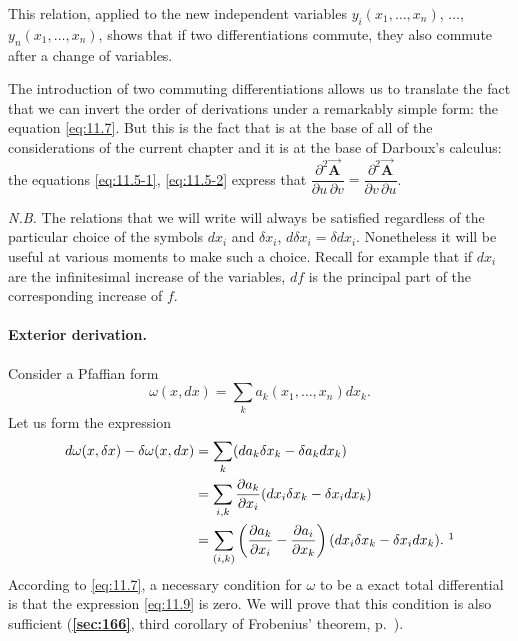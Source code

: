 \documentclass[leqno,11pt]{book}
\numberwithin{equation}{chapter}
\newcommand{\pd}{\partial}
\theoremstyle{shape1}
\theoremstyle{shapesmall}
\newcommand{\fsref}[1]{{\rm\textsection\textbf{\ref{sec:#1}}}}
\newcommand{\somespace}{\vspace{9pt}}
\begin{document}
This relation, applied to the new independent variables $y_{i}(x_{1},\dots,x_{n})$, $\dots$, $y_{n}(x_{1},\dots,x_{n})$, shows that if two differentiations commute, they also commute after a change of variables.

The introduction of two commuting differentiations allows us to translate the fact that we can invert the order of derivations under a remarkably simple form: the equation \eqref{eq:11.7}. But this is the fact that is at the base of all of the considerations of the current chapter and it is at the base of Darboux's calculus: the equations \eqref{eq:11.5-1}, \eqref{eq:11.5-2} express that $\dfrac{\pd^{2}\vec{\mathbf{A}}}{\pd u\,\pd v}=\dfrac{\pd^{2}\vec{\mathbf{A}}}{\pd v\,\pd u}$.

\somespace

\emph{N.B.} The relations that we will write will always be satisfied regardless of the particular choice of the symbols $dx_{i}$ and $\delta x_{i}$, $d\delta x_{i}=\delta dx_{i}$. Nonetheless it will be useful at various moments to make such a choice. Recall for example that if $dx_{i}$ are the infinitesimal increase of the variables, $df$ is the principal part of the corresponding increase of $f$.

\paragraph{Exterior derivation.}
\label{sec:155}
Consider a Pfaffian form
\begin{equation}
  \label{eq:11.8}
  \omega(x,dx)=\sum_{k}a_{k}(x_{1},\dots,x_{n})dx_{k}.
\end{equation}
Let us form the expression
\begin{align}
  \label{eq:11.9}
  d\omega(x,\delta x)-\delta\omega(x,dx)&=\sum_{k}(da_{k}\delta x_{k}-\delta a_{k}dx_{k})\\
  &=\sum_{i,k}\frac{\pd a_{k}}{\pd x_{i}}(dx_{i}\delta x_{k}-\delta x_{i}dx_{k})\notag\\
  &=\sum_{(i,k)}\left(\frac{\pd a_{k}}{\pd x_{i}}-\frac{\pd a_{i}}{\pd x_{k}}\right)(dx_{i}\delta x_{k}-\delta x_{i}dx_{k}).\ \footnotemark\notag
\end{align}
According to \eqref{eq:11.7}, a necessary condition for $\omega$ to be a exact total differential is that the expression \eqref{eq:11.9} is zero. We will prove that this condition is also sufficient (\fsref{166}, third corollary of Frobenius' theorem, p.~\pageref{sec:166}).
\end{document}
